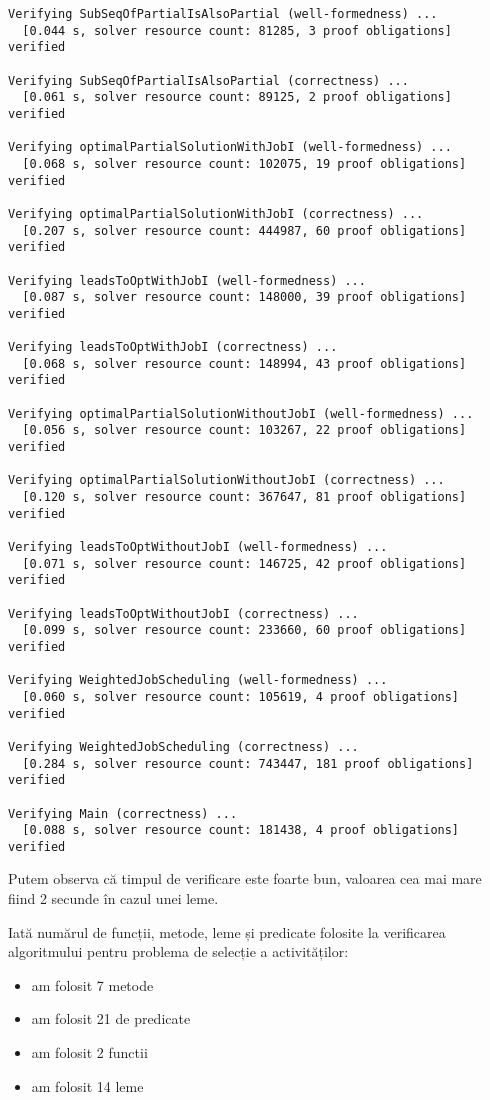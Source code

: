 \begin{Verbatim}[fontsize=\footnotesize]
Verifying SubSeqOfPartialIsAlsoPartial (well-formedness) ...
  [0.044 s, solver resource count: 81285, 3 proof obligations]  verified

Verifying SubSeqOfPartialIsAlsoPartial (correctness) ...
  [0.061 s, solver resource count: 89125, 2 proof obligations]  verified

Verifying optimalPartialSolutionWithJobI (well-formedness) ...
  [0.068 s, solver resource count: 102075, 19 proof obligations]  verified

Verifying optimalPartialSolutionWithJobI (correctness) ...
  [0.207 s, solver resource count: 444987, 60 proof obligations]  verified

Verifying leadsToOptWithJobI (well-formedness) ...
  [0.087 s, solver resource count: 148000, 39 proof obligations]  verified

Verifying leadsToOptWithJobI (correctness) ...
  [0.068 s, solver resource count: 148994, 43 proof obligations]  verified

Verifying optimalPartialSolutionWithoutJobI (well-formedness) ...
  [0.056 s, solver resource count: 103267, 22 proof obligations]  verified

Verifying optimalPartialSolutionWithoutJobI (correctness) ...
  [0.120 s, solver resource count: 367647, 81 proof obligations]  verified

Verifying leadsToOptWithoutJobI (well-formedness) ...
  [0.071 s, solver resource count: 146725, 42 proof obligations]  verified

Verifying leadsToOptWithoutJobI (correctness) ...
  [0.099 s, solver resource count: 233660, 60 proof obligations]  verified

Verifying WeightedJobScheduling (well-formedness) ...
  [0.060 s, solver resource count: 105619, 4 proof obligations]  verified

Verifying WeightedJobScheduling (correctness) ...
  [0.284 s, solver resource count: 743447, 181 proof obligations]  verified

Verifying Main (correctness) ...
  [0.088 s, solver resource count: 181438, 4 proof obligations]  verified
\end{Verbatim}

Putem observa că timpul de verificare este foarte bun, valoarea cea mai mare  fiind 2 secunde în cazul unei leme. 

Iată numărul de funcții, metode, leme și predicate folosite la verificarea algoritmului pentru problema de selecție a activităților:
\begin{itemize}
    \item am folosit 7 metode
    \item am folosit 21 de predicate
    \item am folosit 2 functii
    \item am folosit 14 leme
\end{itemize}

